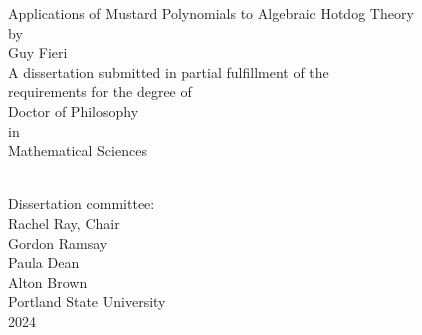 \def\AUTHOR{Guy Fieri}

\def\TITLE{
    Applications of Mustard Polynomials to Algebraic Hotdog Theory
}

\def\DEGREE{
    Doctor of Philosophy\\
    in\\
    Mathematical Sciences
}

\def\COMMITTEE{
    Rachel Ray, Chair\\
    Gordon Ramsay\\
    Paula Dean\\
    Alton Brown
}

\def\INSTITUTION{Portland State University}

\def\YEAR{2024}

\begin{center}
    \TITLE\\[1.0in]
    by\\[12pt]
    \AUTHOR
    \\[1.0in]
    A dissertation submitted in partial fulfillment of the \\
    requirements for the degree of
    \\[1.0in]
    \DEGREE
    \\[1.0in]
    Dissertation committee:\\
    \COMMITTEE\\[1.0in]
    \INSTITUTION\\
    \YEAR
\end{center}